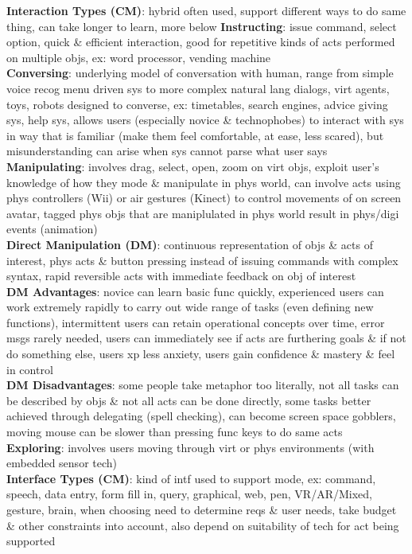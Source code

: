 \documentclass[a4paper]{article}
\begin{document}
\begin{multicols}{3}
        \textbf{Interaction Types (CM)}: hybrid often used, support different ways to do same thing, can take longer to learn, more below
        \textbf{Instructing}: issue command, select option, quick \& efficient interaction, good for repetitive kinds of acts performed on multiple objs, ex: word processor, vending machine\\
        \textbf{Conversing}: underlying model of conversation with human, range from simple voice recog menu driven sys to more complex natural lang dialogs, virt agents, toys, robots designed to converse, ex: timetables, search engines, advice giving sys, help sys, allows users (especially novice \& technophobes) to interact with sys in way that is familiar (make them feel comfortable, at ease, less scared), but misunderstanding can arise when sys cannot parse what user says\\
        \textbf{Manipulating}: involves drag, select, open, zoom on virt objs, exploit user's knowledge of how they mode \& manipulate in phys world, can involve acts using phys controllers (Wii) or air gestures (Kinect) to control movements of on screen avatar, tagged phys objs that are maniplulated in phys world result in phys/digi events (animation)\\
        \textbf{Direct Manipulation (DM)}: continuous representation of objs \& acts of interest, phys acts \& button pressing instead of issuing commands with complex syntax, rapid reversible acts with immediate feedback on obj of interest\\
        \textbf{DM Advantages}: novice can learn basic func quickly, experienced users can work extremely rapidly to carry out wide range of tasks (even defining new functions), intermittent users can retain operational concepts over time, error msgs rarely needed, users can immediately see if acts are furthering goals \& if not do something else, users xp less anxiety, users gain confidence \& mastery \& feel in control\\
        \textbf{DM Disadvantages}: some people take metaphor too literally, not all tasks can be described by objs \& not all acts can be done directly, some tasks better achieved through delegating (spell checking), can become screen space gobblers, moving mouse can be slower than pressing func keys to do same acts\\
        \textbf{Exploring}: involves users moving through virt or phys environments (with embedded sensor tech)\\
        \textbf{Interface Types (CM)}: kind of intf used to support mode, ex: command, speech, data entry, form fill in, query, graphical, web, pen, VR/AR/Mixed, gesture, brain, when choosing need to determine reqs \& user needs, take budget \& other constraints into account, also depend on suitability of tech for act being supported\\

\end{multicols}
\end{document}
